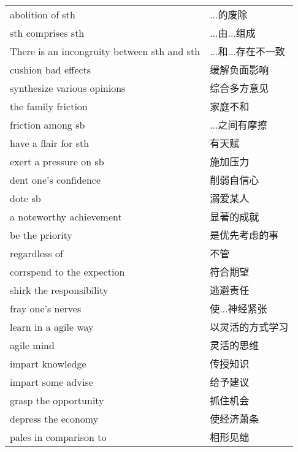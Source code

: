 \begin{tabular}{ll}
    abolition of sth                            & ...的废除       \\
    sth comprises sth                           & ...由...组成    \\
    There is an incongruity between sth and sth & ...和...存在不一致 \\
    cushion bad effects                         & 缓解负面影响       \\
    synthesize various opinions                 & 综合多方意见       \\

    the family friction                         & 家庭不和         \\
    friction among sb                           & ...之间有摩擦     \\
    have a flair for sth                        & 有天赋          \\
    exert a pressure on sb                      & 施加压力         \\
    dent one's confidence                       & 削弱自信心        \\
    dote sb                                     & 溺爱某人         \\
    a noteworthy achievement                    & 显著的成就        \\
    be the priority                             & 是优先考虑的事      \\
    regardless of                               & 不管           \\
    corrspend to the expection                  & 符合期望         \\
    shirk the responsibility                    & 逃避责任         \\
    fray one's nerves                           & 使...神经紧张     \\
    learn in a agile way                        & 以灵活的方式学习     \\
    agile mind                                  & 灵活的思维        \\
    impart knowledge                            & 传授知识         \\
    impart some advise                          & 给予建议         \\
    grasp the opportunity                       & 抓住机会         \\
    depress the economy                         & 使经济萧条        \\
    pales in comparison to                      & 相形见绌         \\
\end{tabular}


